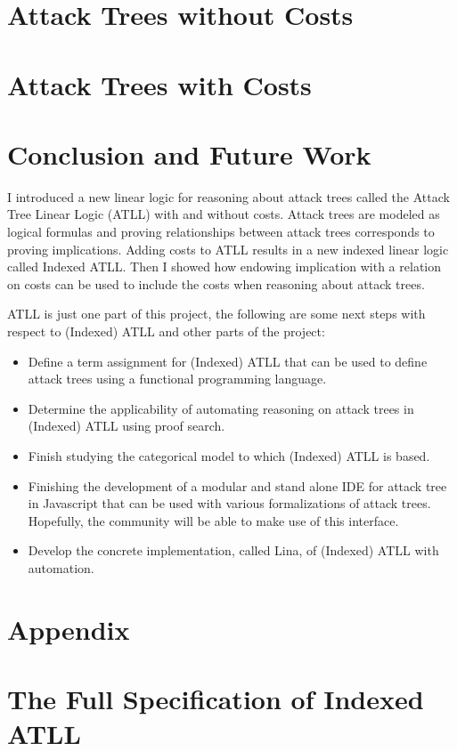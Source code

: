 \documentclass{llncs}
\begin{document}
\section{Attack Trees without Costs}
\label{sec:attack_trees_without_costs}


\section{Attack Trees with Costs}
\label{sec:attack_trees_with_costs}


\section{Conclusion and Future Work}
\label{sec:conclusion}
I introduced a new linear logic for reasoning about attack trees
called the Attack Tree Linear Logic (ATLL) with and without costs.
Attack trees are modeled as logical formulas and proving relationships
between attack trees corresponds to proving implications.  Adding
costs to ATLL results in a new indexed linear logic called Indexed
ATLL.  Then I showed how endowing implication with a relation on costs
can be used to include the costs when reasoning about attack trees.

ATLL is just one part of this project, the following are some next
steps with respect to (Indexed) ATLL and other parts of the project:
\begin{itemize}
\item Define a term assignment for (Indexed) ATLL that can be used to
  define attack trees using a functional programming language.
\item Determine the applicability of automating reasoning on attack
  trees in (Indexed) ATLL using proof search.  
\item Finish studying the categorical model to which (Indexed) ATLL is
  based.
\item Finishing the development of a modular and stand alone IDE for
  attack tree in Javascript that can be used with various
  formalizations of attack trees.  Hopefully, the community will
  be able to make use of this interface.
\item Develop the concrete implementation, called Lina, of (Indexed)
  ATLL with automation.
\end{itemize}





\appendix

\section*{Appendix}
\label{sec:appendix}

\section{The Full Specification of Indexed ATLL}
\label{subsec:the_full_specification_of_indexed_atll}


\end{document}
